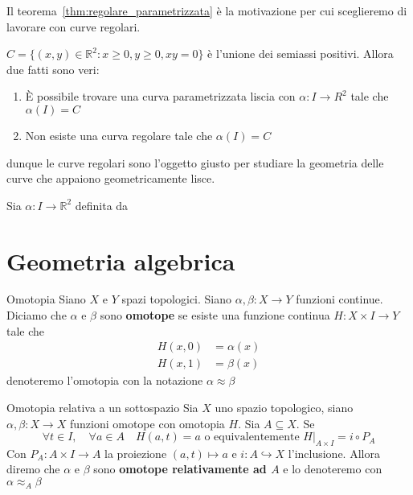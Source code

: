Il teorema~\ref{thm:regolare_parametrizzata} è la motivazione per cui
sceglieremo di lavorare con curve regolari.

\begin{example}
    \(C = \{{(x, y)} \in \mathbb{R}^2 : x \ge 0, y\ge 0, xy=0\}\) è l'unione dei
    semiassi positivi. Allora due fatti sono veri:
\begin{enumerate}[label = \arabic*.]
    \item È possibile trovare una curva parametrizzata liscia con \(\alpha : I
        \to R^2\) tale che \(\alpha{(I)} = C\) 
    \item Non esiste una curva regolare tale che \(\alpha{(I)} = C\)
\end{enumerate}
dunque le curve regolari sono l'oggetto giusto per studiare la geometria delle
curve che appaiono geometricamente lisce.
\end{example}

\begin{example}\label{ex:liscia_angolosa}
    Sia \(\alpha : I \to \mathbb{R}^2\) definita da
\end{example}
    
\chapter{Geometria algebrica}
\begin{definition}{Omotopia}
    Siano \(X\) e \(Y\) spazi topologici. Siano \(\alpha, \beta : X \to Y\)
    funzioni continue. Diciamo che \(\alpha\) e \(\beta\) sono \textbf{omotope}
    se esiste una funzione continua \(H : X \times I \to Y\) tale che
    \begin{align*}
        H{(x, 0)} &= \alpha{(x)} \\
        H{(x, 1)} &= \beta{(x)}
    \end{align*} 
    denoteremo l'omotopia con la notazione \(\alpha \approx \beta\) 
\end{definition}

\begin{definition}{Omotopia relativa a un sottospazio}
    Sia \(X\) uno spazio topologico, siano \(\alpha, \beta : X \to
    X\) funzioni omotope con omotopia \(H\). Sia \(A \subseteq X \). Se 
    \[
      \forall t \in I, \quad \forall a \in A \quad H(a, t) = a \text{ o
      equivalentemente } H|_{A \times I} = i \circ P_A
    \]
    Con \(P_A : A \times I \to A\) la proiezione \({(a, t)} \mapsto a\) e \(i :
    A \hookrightarrow X\) l'inclusione.
    Allora diremo che \(\alpha\) e \(\beta\) sono \textbf{omotope relativamente
    ad \(A\)} e lo denoteremo con \(\alpha \approx_A \beta\) 
\end{definition}


